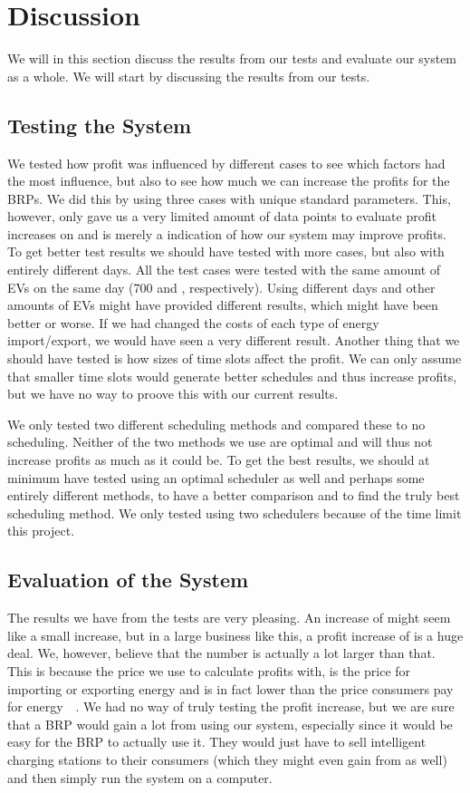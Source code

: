 \section{Discussion}\label{sec:discussion}
We will in this section discuss the results from our tests and evaluate our system as a whole. We will start by discussing the results from our tests. 

\subsection{Testing the System}
We tested how profit was influenced by different cases to see which factors had the most influence, but also to see how much we can increase the profits for the BRPs. We did this by using three cases with unique standard parameters. This, however, only gave us a very limited amount of data points to evaluate profit increases on and is merely a indication of how our system may improve profits. To get better test results we should have tested with more cases, but also with entirely different days. All the test cases were tested with the same amount of EVs on the same day (\num{700} and \protect{}, respectively). Using different days and other amounts of EVs might have provided different results, which might have been better or worse. If we had changed the costs of each type of energy import/export, we would have seen a very different result. Another thing that we should have tested is how sizes of time slots affect the profit. We can only assume that smaller time slots would generate better schedules and thus increase profits, but we have no way to proove this with our current results. 

We only tested two different scheduling methods and compared these to no scheduling. Neither of the two methods we use are optimal and will thus not increase profits as much as it could be. To get the best results, we should at minimum have tested using an optimal scheduler as well and perhaps some entirely different methods, to have a better comparison and to find the truly best scheduling method. We only tested using two schedulers because of the time limit this project. 

\subsection{Evaluation of the System}
The results we have from the tests are very pleasing. An increase of  might seem like a small increase, but in a large business like this, a profit increase of  is a huge deal. We, however, believe that the number is actually a lot larger than that. This is because the price we use to calculate profits with, is the price for importing or exporting energy and is in fact lower than the price consumers pay for energy~\cite{energyPricesCon}~\cite{energyPricesBRP}. We had no way of truly testing the profit increase, but we are sure that a BRP would gain a lot from using our system, especially since it would be easy for the BRP to actually use it. They would just have to sell intelligent charging stations to their consumers (which they might even gain from as well) and then simply run the system on a computer. 

